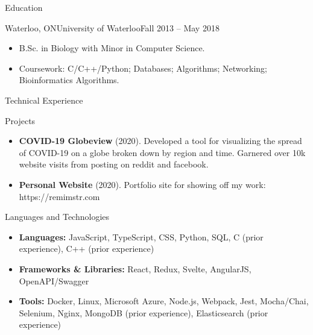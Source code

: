 \documentclass[]{mcdowellcv}
\begin{document}
	\begin{cvsection}{Education}
		\begin{cvsubsection}{Waterloo, ON}{University of Waterloo}{Fall 2013 -- May 2018}
			\begin{itemize}
				\item B.Sc. in Biology with Minor in Computer Science.
				\item Coursework: C/C++/Python; Databases; Algorithms; Networking; Bioinformatics Algorithms.
			\end{itemize}
		\end{cvsubsection}
	\end{cvsection}
	
	\begin{cvsection}{Technical Experience}
		\begin{cvsubsection}{Projects}{}{}
			\begin{itemize}
				\item \textbf{COVID-19 Globeview} (2020). Developed a tool for visualizing the spread of COVID-19 on a globe broken down by region and time. Garnered over 10k website visits from posting on reddit and facebook.
				\item \textbf{Personal Website} (2020). Portfolio site for showing off my work: https://remimstr.com
			\end{itemize}
		\end{cvsubsection}
	\end{cvsection}
	
	\begin{cvsection}{Languages and Technologies}
		\begin{cvsubsection}{}{}{}	
			\begin{itemize}
				\item \textbf{Languages:} JavaScript, TypeScript, CSS, Python, SQL, C (prior experience), C++ (prior experience)
				\item \textbf{Frameworks \& Libraries:} React, Redux, Svelte, AngularJS, OpenAPI/Swagger
				\item \textbf{Tools:} Docker, Linux, Microsoft Azure, Node.js, Webpack, Jest, Mocha/Chai, Selenium, Nginx, MongoDB (prior experience), Elasticsearch (prior experience)
			\end{itemize}
		\end{cvsubsection}
	\end{cvsection}
	
\end{document}
